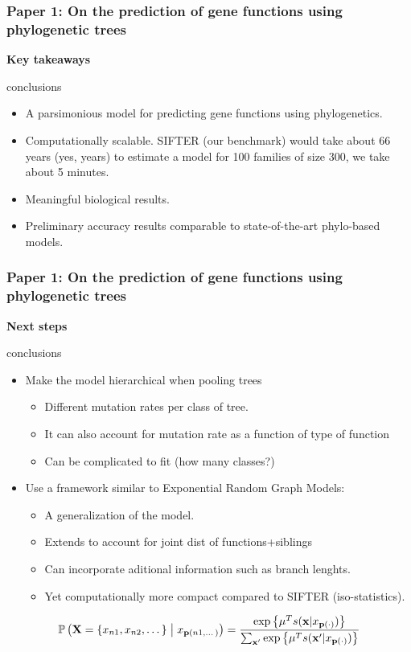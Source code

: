 \documentclass[aspectratio=169, 9pt]{beamer}\usepackage[]{graphicx}\usepackage[]{color}
\begin{document}
\begin{frame}[t]
\frametitle{Paper 1: On the prediction of gene functions using phylogenetic trees}

{\bf \large Key takeaways}
\begin{beamercolorbox}[dp=1ex]{conclusions}
\begin{itemize}
\item A parsimonious model for predicting gene functions using phylogenetics.
\item Computationally scalable. SIFTER (our benchmark)
would take about 66 years (yes, years) to estimate a model for 100 families
of size 300, we take about 5 minutes.
\item Meaningful biological results.
\item Preliminary accuracy results comparable to state-of-the-art phylo-based models.
\end{itemize}
\end{beamercolorbox}

\end{frame}

\begin{frame}[t]
\frametitle{Paper 1: On the prediction of gene functions using phylogenetic trees}

{\bf \large Next steps}
\begin{beamercolorbox}[dp=1ex]{conclusions}
\begin{itemize}
\item Make the model hierarchical when pooling trees\pause
\begin{itemize}
\item Different mutation rates per class of tree.
\item It can also account for mutation rate as a function of type of function
\item Can be complicated to fit (how many classes?)
\end{itemize}\pause
\item Use a framework similar to Exponential Random Graph Models:\pause
\begin{itemize}
\item A generalization of the model.
\item Extends to account for joint dist of functions+siblings
\item Can incorporate aditional information such as branch lenghts.
\item Yet computationally more compact compared to SIFTER (iso-statistics).
\end{itemize}
\end{itemize}
\pause
$$
\Prcond{\Ann=\{\ann{n1}, \ann{n2},\dots\}}{\ann{\parent{n1, \dots}}} = \frac{\exp{\mu^{T} s(\mathbf{x}|\ann{\parent{\cdot}})}}{\sum_{\mathbf{x}'}\exp{\mu^{T} s(\mathbf{x}'|\ann{\parent{\cdot}})}}
$$

\end{beamercolorbox}

\end{frame}
\end{document}
